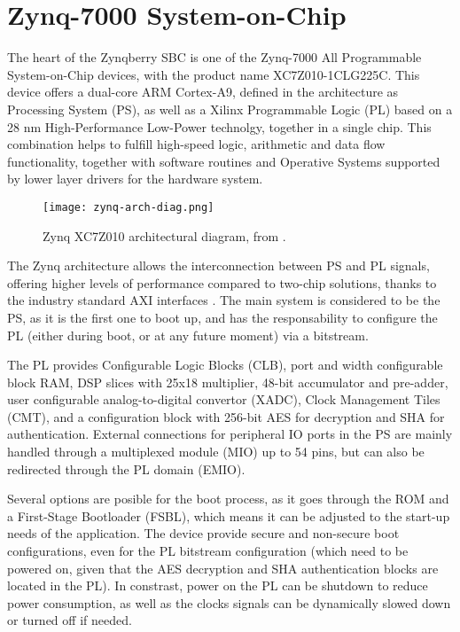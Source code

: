 \section{Zynq-7000 System-on-Chip}\label{zynq7-soc}

The heart of the Zynqberry SBC is one of the Zynq-7000 All Programmable System-on-Chip devices, with
the product name XC7Z010-1CLG225C. This device offers a dual-core ARM Cortex-A9, defined in the
architecture as Processing System (PS), as well as a Xilinx Programmable Logic (PL) based on a 28 nm
High-Performance Low-Power technolgy, together in a single chip. This combination helps to fulfill
high-speed logic, arithmetic and data flow functionality, together with software routines and
Operative Systems supported by lower layer drivers for the hardware system.

\begin{figure}[htp]
	\centering
	\texttt{[image: zynq-arch-diag.png]}
	\caption{Zynq XC7Z010 architectural diagram, from \cite{DS190}.} \label{fig:zynq-arch-diag}
\end{figure}

The Zynq architecture allows the interconnection between PS  and PL signals, offering higher levels
of performance compared to two-chip solutions, thanks to the industry standard AXI interfaces
\cite{Crokett2014}. The main system is considered to be the PS, as it is the first one to boot up,
and has the responsability to configure the PL (either during boot, or at any future moment) via a
bitstream.

The PL provides Configurable Logic Blocks (CLB), port and width configurable block RAM, DSP slices
with 25x18 multiplier, 48-bit accumulator and pre-adder, user configurable analog-to-digital
convertor (XADC), Clock Management Tiles (CMT), and a configuration block with 256-bit AES for
decryption and SHA for authentication. External connections for peripheral IO ports in the PS are
mainly handled through a multiplexed module (MIO) up to 54 pins, but can also be redirected through
the PL domain (EMIO).

Several options are posible for the boot process, as it goes through the ROM and a First-Stage
Bootloader (FSBL), which means it can be adjusted to the start-up needs of the application. The
device provide secure and non-secure boot configurations, even for the PL bitstream configuration
(which need to be powered on, given that the AES decryption and SHA authentication blocks are
located in the PL). In constrast, power on the PL can be shutdown to reduce power consumption, as
well as the clocks signals can be dynamically slowed down or turned off if needed.

